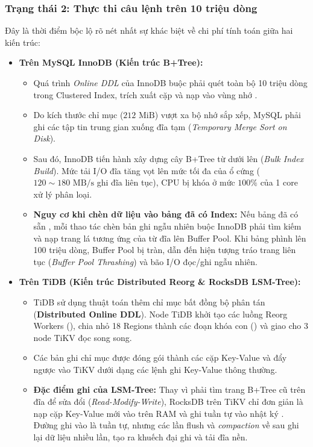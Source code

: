 \subsubsection{Trạng thái 2: Thực thi câu lệnh  trên 10 triệu dòng}
Đây là thời điểm bộc lộ rõ nét nhất sự khác biệt về chi phí tính toán giữa hai kiến trúc:
\begin{itemize}
  \item \textbf{Trên MySQL InnoDB (Kiến trúc B+Tree):}
  \begin{itemize}
    \item Quá trình \textit{Online DDL} của InnoDB buộc phải quét toàn bộ 10 triệu dòng trong Clustered Index, trích xuất cặp  và nạp vào vùng nhớ .
    \item Do kích thước chỉ mục ($212\text{ MiB}$) vượt xa bộ nhớ sắp xếp, MySQL phải ghi các tập tin trung gian xuống đĩa tạm (\textit{Temporary Merge Sort on Disk}).
    \item Sau đó, InnoDB tiến hành xây dựng cây B+Tree từ dưới lên (\textit{Bulk Index Build}). Mức tải I/O đĩa tăng vọt lên mức tối đa của ổ cứng ($120 \sim 180\text{ MB/s}$ ghi đĩa liên tục), CPU bị khóa ở mức $100\%$ của 1 core xử lý phân loại.
    \item \textbf{Nguy cơ khi chèn dữ liệu vào bảng đã có Index:} Nếu bảng đã có sẵn , mỗi thao tác chèn bản ghi ngẫu nhiên buộc InnoDB phải tìm kiếm và nạp trang lá tương ứng của  từ đĩa lên Buffer Pool. Khi bảng phình lên 100 triệu dòng, Buffer Pool bị tràn, dẫn đến hiện tượng tráo trang liên tục (\textit{Buffer Pool Thrashing}) và bão I/O đọc/ghi ngẫu nhiên.
  \end{itemize}

  \item \textbf{Trên TiDB (Kiến trúc Distributed Reorg \& RocksDB LSM-Tree):}
  \begin{itemize}
    \item TiDB sử dụng thuật toán thêm chỉ mục bất đồng bộ phân tán (\textbf{Distributed Online DDL}). Node TiDB khởi tạo các luồng Reorg Workers (), chia nhỏ 18 Regions thành các đoạn khóa con () và giao cho 3 node TiKV đọc song song.
    \item Các bản ghi chỉ mục  được đóng gói thành các cặp Key-Value và đẩy ngược vào TiKV dưới dạng các lệnh ghi Key-Value thông thường.
    \item \textbf{Đặc điểm ghi của LSM-Tree:} Thay vì phải tìm trang B+Tree cũ trên đĩa để sửa đổi (\textit{Read-Modify-Write}), RocksDB trên TiKV chỉ đơn giản là nạp cặp Key-Value mới vào  trên RAM và ghi tuần tự vào nhật ký . Đường ghi vào  là tuần tự, nhưng các lần flush và \textit{compaction} về sau ghi lại dữ liệu nhiều lần, tạo ra khuếch đại ghi và tải đĩa nền.
  \end{itemize}
\end{itemize}

